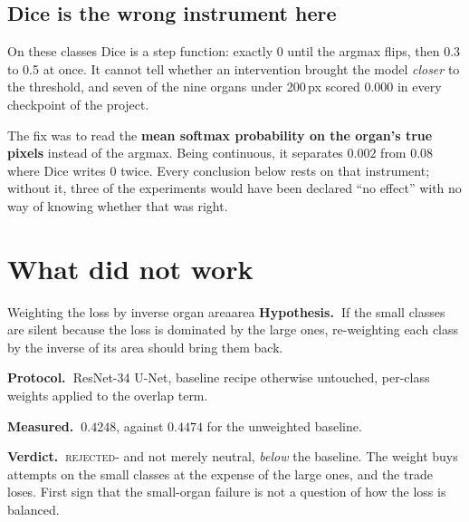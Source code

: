 \documentclass{article}
\newcounter{exper}
\newcommand{\hyp}{\textbf{Hypothesis.\ }}
\newcommand{\proto}{\textbf{Protocol.\ }}
\newcommand{\meas}{\textbf{Measured.\ }}
\newcommand{\verd}{\textbf{Verdict.\ }}
\newcommand{\rejected}{\textcolor{myred}{\textsc{rejected}}}
\begin{document}
\subsection{Dice is the wrong instrument here}

On these classes Dice is a step function: exactly 0 until the argmax flips, then
0.3 to 0.5 at once. It cannot tell whether an intervention brought the model
\emph{closer} to the threshold, and seven of the nine organs under 200\,px scored
0.000 in every checkpoint of the project.

\vspace{2.0mm}

\noindent The fix was to read the \textbf{mean softmax probability on the organ's true
pixels} instead of the argmax. Being continuous, it separates $0.002$ from
$0.08$ where Dice writes 0 twice. Every conclusion below rests on that
instrument; without it, three of the experiments would have been declared ``no
effect'' with no way of knowing whether that was right.

\newpage

\section{What did not work}
\label{sec:failed}

\begin{expfail}{Weighting the loss by inverse organ area}{area}
\hyp If the small classes are silent because the loss is dominated by the large
ones, re-weighting each class by the inverse of its area should bring them back.

\proto ResNet-34 U-Net, baseline recipe otherwise untouched, per-class weights
applied to the overlap term.

\meas $0.4248$, against $0.4474$ for the unweighted baseline.

\verd \rejected - and not merely neutral, \emph{below} the baseline. The weight
buys attempts on the small classes at the expense of the large ones, and the
trade loses. First sign that the small-organ failure is not a question of how the
loss is balanced.
\end{expfail}
\end{document}
